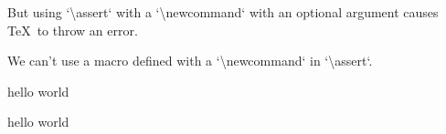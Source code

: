 \documentclass[12pt,\documentclassflag]{lawbrief}
\begin{document}
But using `\textbackslash{}assert` with a `\textbackslash{}newcommand` with an optional argument
causes \TeX\ to throw an error.

\begin{LTXexample}
  \newcommand\testAssertD[1][hello]{#1 world}
\end{LTXexample}

We can't use a macro defined with a `\textbackslash{}newcommand` in `\textbackslash{}assert`.

\begin{LTXexample}
  \newcommand\testAssertE[1][hello]{#1 world}%
  \testAssertE 
  
  \testAssertE{}
  
\end{LTXexample}
\end{document}
